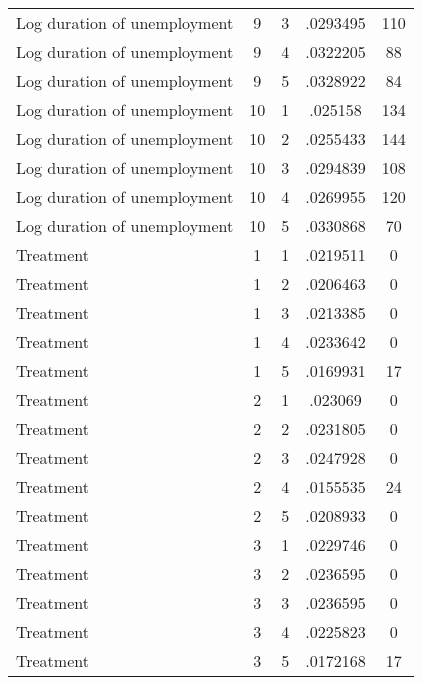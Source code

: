 \begin{tabular}{l*{4}{c}}
Log duration of unemployment&           9&           3&    .0293495&         110\\
Log duration of unemployment&           9&           4&    .0322205&          88\\
Log duration of unemployment&           9&           5&    .0328922&          84\\
Log duration of unemployment&          10&           1&     .025158&         134\\
Log duration of unemployment&          10&           2&    .0255433&         144\\
Log duration of unemployment&          10&           3&    .0294839&         108\\
Log duration of unemployment&          10&           4&    .0269955&         120\\
Log duration of unemployment&          10&           5&    .0330868&          70\\
Treatment           &           1&           1&    .0219511&           0\\
Treatment           &           1&           2&    .0206463&           0\\
Treatment           &           1&           3&    .0213385&           0\\
Treatment           &           1&           4&    .0233642&           0\\
Treatment           &           1&           5&    .0169931&          17\\
Treatment           &           2&           1&     .023069&           0\\
Treatment           &           2&           2&    .0231805&           0\\
Treatment           &           2&           3&    .0247928&           0\\
Treatment           &           2&           4&    .0155535&          24\\
Treatment           &           2&           5&    .0208933&           0\\
Treatment           &           3&           1&    .0229746&           0\\
Treatment           &           3&           2&    .0236595&           0\\
Treatment           &           3&           3&    .0236595&           0\\
Treatment           &           3&           4&    .0225823&           0\\
Treatment           &           3&           5&    .0172168&          17\\

\end{tabular}
